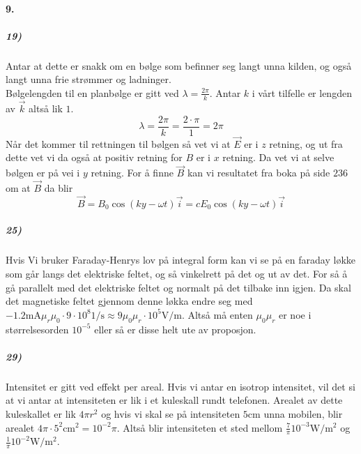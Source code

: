 \documentclass[11pt, A4paper,norsk]{article}
\begin{document}
		\paragraph{9.}
			\subparagraph{19)}
				\begin{flushleft}
Antar at dette er snakk om en bølge som befinner seg langt unna kilden, og også langt unna frie strømmer og ladninger. \\
Bølgelengden til en planbølge er gitt ved $\lambda = \frac{2 \pi}{k}$. Antar $k$ i vårt tilfelle er lengden av $\vec{k}$ altså lik $1$.
$$\lambda = \frac{2 \pi}{k} = \frac{2 \cdot \pi}{1} = 2 \pi$$
Når det kommer til rettningen til bølgen så vet vi at $\vec{E}$ er i $z$ retning, og ut fra dette vet vi da også at positiv retning for $B$ er i $x$ retning. Da vet vi at selve bølgen er på vei i $y$ retning. For å finne $\vec{B}$ kan vi resultatet fra boka på side $236$ om at $\vec{B}$ da blir
$$\vec{B} = B_0 \cos(k y - \omega t) \vec{i} = c E_0 \cos(k y - \omega t) \vec{i}$$
				\end{flushleft}












			\subparagraph{25)}
				\begin{flushleft}
Hvis Vi bruker Faraday-Henrys lov på integral form kan vi se på en faraday løkke som går langs det elektriske feltet, og så vinkelrett på det og ut av det. For så å gå parallelt med det elektriske feltet og normalt på det tilbake inn igjen. Da skal det magnetiske feltet gjennom denne løkka endre seg med $- 1.2 \text{mA} \mu_r \mu_0 \cdot 9 \cdot 10^{8} 1/\text{s} \approx 9 \mu_0 \mu_r \cdot 10^{5} \text{V}/\text{m}$. Altså må enten $\mu_0 \mu_r$ er noe i størrelsesorden $10^{-5}$ eller så er disse helt ute av proposjon.
				\end{flushleft}










			\subparagraph{29)}
				\begin{flushleft}
Intensitet er gitt ved effekt per areal. Hvis vi antar en isotrop intensitet, vil det si at vi antar at intensiteten er lik i et kuleskall rundt telefonen. Arealet av dette kuleskallet er lik $4 \pi r^2$ og hvis vi skal se på intensiteten $5$cm unna mobilen, blir arealet $4 \pi \cdot 5^2 \text{cm}^2 = 10^{-2} \pi$. Altså blir intensiteten et sted mellom $\frac{7}{\pi} 10^{-3} \text{W}/\text{m}^2$ og $\frac{1}{\pi} 10^{-2} \text{W}/\text{m}^2$.
				\end{flushleft}
\end{document}
